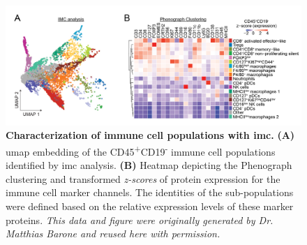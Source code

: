 \begin{figure}[t]
\centering
\includegraphics[width=\linewidth]{Chapter4/Fig/F2-2-01.png}
\caption[Characterization of immune cell populations with ]{\textbf{Characterization of immune cell populations with \gls{imc}.} \textbf{(A)} \gls{umap} embedding of the CD45\textsuperscript{+}CD19\textsuperscript{-} immune cell populations identified by \gls{imc} analysis. \textbf{(B)}  Heatmap depicting the Phenograph clustering and transformed \textit{z-scores} of protein expression for the immune cell marker channels. The identities of the sub-populations were defined based on the relative expression levels of these marker proteins. \textit{This data and figure were originally generated by Dr. Matthias Barone and reused here with permission.}}
\label{fig:chp2_imc_umap}
\end{figure}

